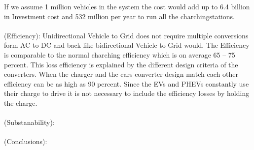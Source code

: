 \documentclass[12pt,a4paper]{article}
\begin{document}
\begin{parcolumns}[colwidths={1=2.5 cm, 2=10 cm, 3=2.5cm}]{3}
{%
If we assume 1 million vehicles in the system the cost would add up to 6.4 billion in Investment cost and 532 million per year to run all the charchingstations.
\\ \\
\noindent
(Efficiency): Unidirectional Vehicle to Grid does not require multiple conversions form AC to DC and back like bidirectional Vehicle to Grid would. The Efficiency is comparable to the normal charching efficiency which is on average 65 – 75 percent. This loss efficiency is explained by the different design criteria of the converters. When the charger and the cars converter design match each other efficiency can be as high as 90 percent. Since the EVs and PHEVs constantly use their charge to drive it is not necessary to include the efficiency losses by holding the charge.%
\\ \\
\noindent
(Substanability):
\\ \\
\noindent
(Conclusions):
}


\end{parcolumns}
\end{document}
